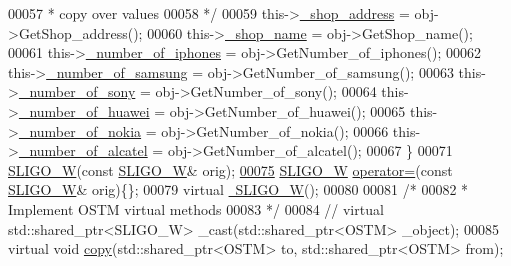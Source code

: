 \begin{DoxyCode}
00057 \textcolor{comment}{         * copy over values}
00058 \textcolor{comment}{         */}
00059         this->\hyperlink{class_s_l_i_g_o___w_ade08b79101c67997dde54515f2088b9d_ade08b79101c67997dde54515f2088b9d}{\_shop\_address} = obj->GetShop\_address();
00060         this->\hyperlink{class_s_l_i_g_o___w_a01bebef43ff4b4d9d728489f05b94d86_a01bebef43ff4b4d9d728489f05b94d86}{\_shop\_name} = obj->GetShop\_name();
00061         this->\hyperlink{class_s_l_i_g_o___w_aa958eed564796bb349d15bf2b2e3208d_aa958eed564796bb349d15bf2b2e3208d}{\_number\_of\_iphones} = obj->GetNumber\_of\_iphones();
00062         this->\hyperlink{class_s_l_i_g_o___w_a2c7845560ec14452132d659eb54f2cec_a2c7845560ec14452132d659eb54f2cec}{\_number\_of\_samsung} = obj->GetNumber\_of\_samsung();
00063         this->\hyperlink{class_s_l_i_g_o___w_a0ccf87fe78352e1eac98ed3c85810caa_a0ccf87fe78352e1eac98ed3c85810caa}{\_number\_of\_sony} = obj->GetNumber\_of\_sony();
00064         this->\hyperlink{class_s_l_i_g_o___w_af9ca2fb509b7b8ca9f1860ece827501f_af9ca2fb509b7b8ca9f1860ece827501f}{\_number\_of\_huawei} = obj->GetNumber\_of\_huawei();
00065         this->\hyperlink{class_s_l_i_g_o___w_a9fe78b9365c145432d58cb947b01111a_a9fe78b9365c145432d58cb947b01111a}{\_number\_of\_nokia} = obj->GetNumber\_of\_nokia();
00066         this->\hyperlink{class_s_l_i_g_o___w_acbf32331901a3fc710c5c97d286b6fcf_acbf32331901a3fc710c5c97d286b6fcf}{\_number\_of\_alcatel} = obj->GetNumber\_of\_alcatel();
00067     \}
00071     \hyperlink{class_s_l_i_g_o___w_a9b669809dc7cf8d9982181ac7997b0da_a9b669809dc7cf8d9982181ac7997b0da}{SLIGO\_W}(\textcolor{keyword}{const} \hyperlink{class_s_l_i_g_o___w}{SLIGO\_W}& orig);
\hypertarget{_s_l_i_g_o___w_8h_source.tex_l00075}{}\hyperlink{class_s_l_i_g_o___w_a64051fdd5b3ebc47b0a74b42eb092c1b_a64051fdd5b3ebc47b0a74b42eb092c1b}{00075}     \hyperlink{class_s_l_i_g_o___w}{SLIGO\_W} \hyperlink{class_s_l_i_g_o___w_a64051fdd5b3ebc47b0a74b42eb092c1b_a64051fdd5b3ebc47b0a74b42eb092c1b}{operator=}(\textcolor{keyword}{const} \hyperlink{class_s_l_i_g_o___w}{SLIGO\_W}& orig)\{\};
00079     \textcolor{keyword}{virtual} \hyperlink{class_s_l_i_g_o___w_aa6cc833af07309dee5eb2493cddf443c_aa6cc833af07309dee5eb2493cddf443c}{~SLIGO\_W}();
00080     
00081     \textcolor{comment}{/*}
00082 \textcolor{comment}{     * Implement OSTM virtual methods}
00083 \textcolor{comment}{     */}
00084    \textcolor{comment}{// virtual std::shared\_ptr<SLIGO\_W> \_cast(std::shared\_ptr<OSTM> \_object);}
00085     \textcolor{keyword}{virtual} \textcolor{keywordtype}{void} \hyperlink{class_s_l_i_g_o___w_acd5ae7347e6ca94c52eb013e07a66116_acd5ae7347e6ca94c52eb013e07a66116}{copy}(std::shared\_ptr<OSTM> to, std::shared\_ptr<OSTM> from);

\end{DoxyCode}
